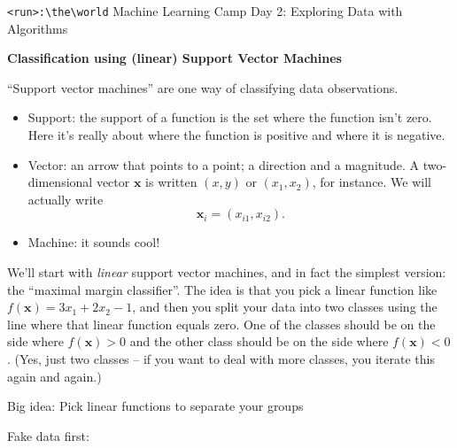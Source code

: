 \documentclass[10pt]{article}
\renewcommand{\vec}[1]{\mathbf{#1}}
\newcommand{\code}[1]{\colorbox{light-gray}{\texttt{#1}}}
\newcommand{\headerclass}{\code{<run>:\textbackslash the\textbackslash world} Machine Learning Camp}
\newcommand{\headersection}{Day 2: Exploring Data with Algorithms}
\newcommand{\headertitle}{Classification using (linear) Support Vector Machines}
\begin{document}
\headerclass\xspace {} \headersection\\
\begin{center}{ \large \textbf{\headertitle} }\end{center}





``Support vector machines'' are one way of classifying data observations. 
\begin{itemize}
\item Support: the support of a function is the set where the function isn't zero. Here it's really about where the function is positive and where it is negative.
\item Vector: an arrow that points to a point; a direction and a magnitude. A two-dimensional vector $\vec{x}$ is written $(x,y)$ or $(x_1, x_2)$, for instance. We will actually write \[\vec{x}_i = (x_{i1},x_{i2}).\]
\item Machine: it sounds cool! 
\end{itemize}
We'll start with \textit{linear} support vector machines, and in fact the simplest version: the ``maximal margin classifier''. The idea is that you pick a linear function like $f(\vec{x}) = 3x_1+2x_2-1$, and then you split your data into two classes using the line where that linear function equals zero. One of the classes should be on the side where $f(\vec{x}) > 0$ and the other class should be on the side where $f(\vec{x}) < 0$. (Yes, just two classes -- if you want to deal with more classes, you iterate this again and again.)
\bigskip
\begin{center}
Big idea: Pick linear functions to separate your groups
\end{center}
\bigskip

Fake data first:
\end{document}

